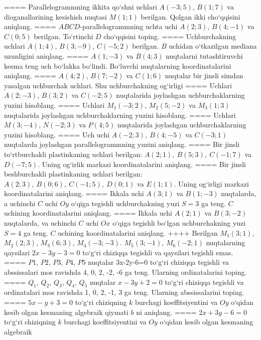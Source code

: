 ====
Parallelogrammning ikkita qo‘shni uchlari $A (-3;5) $, $B (1;7) $
va dioganallarining kesishish nuqtasi $M (1;1)$ berilgan. Qolgan ikki
cho‘qqisini aniqlang.
====
$ABCD$-parallelogrammning uchta uchi
$A (2;3) $, $B (4;-1) $ va $C (0;5) $ berilgan. To‘rtinchi $D$
cho‘qqisini toping.
====
Uchburchakning uchlari $A (1;4) $, $B (3;-9) $, $C (-5;2) $
berilgan. $B$ uchidan o‘tkazilgan mediana uzunligini aniqlang.
====
$A (1;-3) $ va $B (4;3) $ nuqtalarni tutashtiruvchi
kesma teng uch bo‘lakka bo‘lindi. Bo‘luvchi nuqtalarning koordinatalarini
aniqlang.
====
$A (4;2) $, $B (7;-2) $ va $C (1;6) $ nuqtalar bir jinsli
simdan yasalgan uchburchak uchlari. Shu uchburchakning og‘irligi
====
Uchlari $A (2;-3) $, $B (3;2) $ va $C (-2;5) $
nuqtalarida joylashgan uchburchaklarning yuzini hisoblang.
====
Uchlari $M_1 (-3;2) $, $M_2 (5;-2) $ va $M_3 (1;3) $
nuqtalarida joylashgan uchburchaklarning yuzini hisoblang.
====
Uchlari $M (3;-4) $, $N (-2;3) $ va $P (4;5) $
nuqtalarida joylashgan uchburchaklarning yuzini hisoblang.
====
Uch uchi $A (-2;3), \ B (4;-5) $ va
$C (-3;1)$ nuqtalarda joylashgan parallelogrammning yuzini aniqlang.
====
Bir jinsli to‘rtburchakli plastinkaning uchlari berilgan:
$A (2;1), \ B (5;3), \ C (-1;7) $ va $D (-7;5) $. Uning og‘irlik markazi
koordinatalarini aniqlang.
====
Bir jinsli beshburchakli plastinkaning uchlari berilgan:
$A (2;3), \ B (0;6), \ C (-1;5), \ D (0;1) $ va $E (1;1) $. Uning og‘irligi
markazi koordinatalarini aniqlang.
====
Ikkala uchi $A (3;1) $ va $B (1;-3) $ nuqtalarda, a
uchinchi $C$ uchi $Oy$ o‘qiga tegishli uchburchakning
yuzi $S=3$ ga teng. $C$ uchining koordinatalarini aniqlang.
====
Ikkala uchi $A (2;1) $ va $B (3;-2) $ nuqtalarda, va
uchinchi $C$ uchi $Ox$ o‘qiga tegishli bo‘lgan uchburchakning
yuzi $S=4$ ga teng. $C$ uchining koordinatalarini aniqlang.
++++
Berilgan $M_1 (3; 1) $, $M_2 (2; 3) $, $M_3 (6; 3) $,
$M_4 (-3;-3) $. $M_5 (3;-1) $, $M_6 (-2; 1) $ nuqtalarning qaysilari
$2x-3y-3 = 0$ to‘g‘ri chiziqqa tegishli va qaysilari tegishli
emas.
====
$P1$, $P2$, $P3$, $P4$, $P5$ nuqtalar
3x-2y-6=0 to‘g‘ri chiziqqa tegishli va abssissalari mos ravishda
4, 0, 2, -2, -6 ga teng. Ularning ordinatalarini toping.
====
$Q_1$, $Q_2$, $Q_3$, $Q_4$, $Q_5$ nuqtalar
$x-3y+2=0$ to‘g‘ri chiziqqa tegishli va ordinatalari mos ravishda
1, 0, 2, -1, 3 ga teng. Ularning abssissalarini toping.
====
$5x-y+3=0$ to‘g‘ri chiziqning $k$ burchagi
koeffitsiyentini va $Oy$ o‘qidan kesib olgan kesmaning algebraik
qiymati $b$ ni aniqlang.
====
$2x+3y-6=0$ to‘g‘ri chiziqning $k$ burchagi
koeffitsiyentini va $Oy$ o‘qidan kesib olgan kesmaning algebraik
